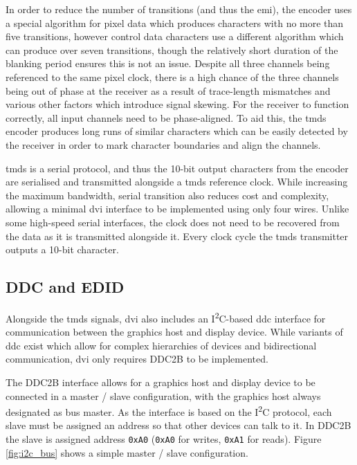 In order to reduce the number of transitions (and thus the \gls{emi}), the encoder uses a special algorithm for pixel data which produces characters with no more than five transitions, however control data characters use a different algorithm which can produce over seven transitions, though the relatively short duration of the blanking period ensures this is not an issue. Despite all three channels being referenced to the same pixel clock, there is a high chance of the three channels being out of phase at the receiver as a result of trace-length mismatches and various other factors which introduce signal skewing. For the receiver to function correctly, all input channels need to be phase-aligned. To aid this, the \gls{tmds} encoder produces long runs of similar characters which can be easily detected by the receiver in order to mark character boundaries and align the channels.

\gls{tmds} is a serial protocol, and thus the 10-bit output characters from the encoder are serialised and transmitted alongside a \gls{tmds} reference clock. While increasing the maximum bandwidth, serial transition also reduces cost and complexity, allowing a minimal \gls{dvi} interface to be implemented using only four wires. Unlike some high-speed serial interfaces, the clock does not need to be recovered from the data as it is transmitted alongside it. Every clock cycle the \gls{tmds} transmitter outputs a 10-bit character.

\subsection{DDC and EDID}

Alongside the \gls{tmds} signals, \gls{dvi} also includes an I\textsuperscript{2}C-based \gls{ddc} interface for communication between the graphics host and display device. While variants of \gls{ddc} exist which allow for complex hierarchies of devices and bidirectional communication, \gls{dvi} only requires DDC2B to be implemented.

The DDC2B interface allows for a graphics host and display device to be connected in a master / slave configuration, with the graphics host always designated as bus master. As the interface is based on the I\textsuperscript{2}C protocol, each slave must be assigned an address so that other devices can talk to it. In DDC2B the slave is assigned address \texttt{0xA0} (\texttt{0xA0} for writes, \texttt{0xA1} for reads). Figure \ref{fig:i2c_bus} shows a simple master / slave configuration.


